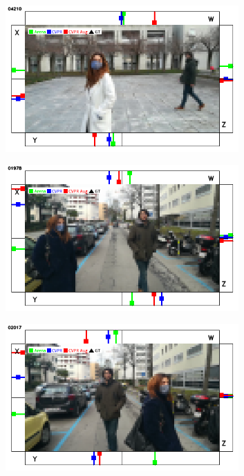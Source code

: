\begin{figure}[H]
\begin{center}
\begin{subfigure}[h]{0.49\textwidth}
		\end{subfigure}
		\hfill
		\begin{subfigure}[h]{0.49\textwidth}
			\centering
			\includegraphics[width=0.98\textwidth]{"contents/images/qualitative-videos/double3-square02-4210"}
		\end{subfigure}
		\vfill
		\begin{subfigure}[h]{0.49\textwidth}
			\centering
			\includegraphics[width=0.98\textwidth]{"contents/images/qualitative-videos/double6-street01-1978"}
		\end{subfigure}
		\hfill
		\begin{subfigure}[h]{0.49\textwidth}
			\centering
			\includegraphics[width=0.98\textwidth]{"contents/images/qualitative-videos/double6-street01-2017"}

\end{subfigure}
\end{center}
\end{figure}
